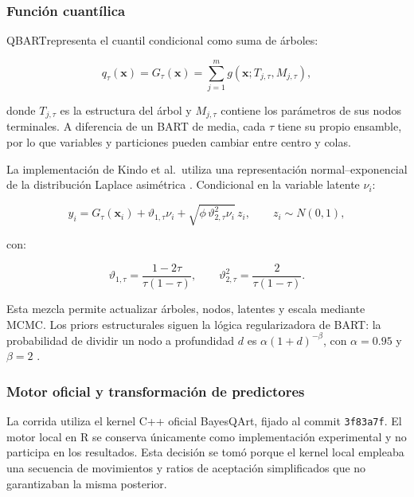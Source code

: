 \documentclass[11pt,a4paper]{article}
\newcommand{\qbart}{\textsc{QBART}}
\begin{document}
\subsubsection{Función cuantílica}

\qbart representa el cuantil condicional como suma de árboles:

\begin{equation}
  q_{\tau}(\bm x)
  =
  G_{\tau}(\bm x)
  =
  \sum_{j=1}^{m}g(\bm x;T_{j,\tau},M_{j,\tau}),
\end{equation}

donde \(T_{j,\tau}\) es la estructura del árbol y \(M_{j,\tau}\) contiene
los parámetros de sus nodos terminales. A diferencia de un BART de media,
cada \(\tau\) tiene su propio ensamble, por lo que variables y particiones
pueden cambiar entre centro y colas.

La implementación de Kindo et al.\ utiliza una representación
normal--exponencial de la distribución Laplace asimétrica
\cite{kindo2016}. Condicional en la variable latente \(\nu_i\):

\begin{equation}
  y_i
  =
  G_{\tau}(\bm x_i)
  +
  \vartheta_{1,\tau}\nu_i
  +
  \sqrt{\phi\,\vartheta_{2,\tau}^{2}\nu_i}\,z_i,
  \qquad z_i\sim N(0,1),
\end{equation}

con:

\begin{equation}
  \vartheta_{1,\tau}
  =
  \frac{1-2\tau}{\tau(1-\tau)},
  \qquad
  \vartheta_{2,\tau}^{2}
  =
  \frac{2}{\tau(1-\tau)}.
\end{equation}

Esta mezcla permite actualizar árboles, nodos, latentes y escala mediante
MCMC. Los priors estructurales siguen la lógica regularizadora de BART:
la probabilidad de dividir un nodo a profundidad \(d\) es
\(\alpha(1+d)^{-\beta}\), con \(\alpha=0.95\) y \(\beta=2\)
\cite{chipman2010}.

\subsubsection{Motor oficial y transformación de predictores}

La corrida utiliza el kernel C++ oficial BayesQArt, fijado al commit
\texttt{3f83a7f}. El motor local en R se conserva únicamente como
implementación experimental y no participa en los resultados. Esta decisión
se tomó porque el kernel local empleaba una secuencia de movimientos y
ratios de aceptación simplificados que no garantizaban la misma posterior.
\end{document}
